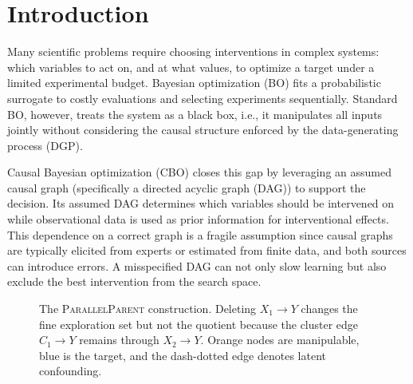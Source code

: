 \documentclass[twoside]{article}
\begin{document}


\begin{abstract}
Ignore the abstract for now

We need to write this, just writing here something so that the figure appears on the right side of the page 

for visual purposes only

right 

right

right

right

right

right

right
\end{abstract}

\section{Introduction}
\label{sec:intro}

Many scientific problems require choosing interventions in complex systems: which variables to act on, and at what values, to optimize a target under a limited experimental budget. Bayesian optimization (BO) fits a probabilistic surrogate to costly evaluations and selecting experiments sequentially. Standard BO, however, treats the system as a black box, i.e., it manipulates all inputs jointly without considering the causal structure enforced by the data-generating process (DGP). 

Causal Bayesian optimization (CBO)
\citep{agliettiCausalBayesianOptimization2020b} closes this gap by leveraging an assumed causal graph (specifically a directed acyclic graph (DAG)) to support the decision. Its assumed DAG determines which variables should be intervened on while observational data is used as prior information for interventional effects. This dependence on a correct graph is a fragile assumption since causal graphs are typically elicited from experts or estimated from finite data, and both sources can introduce errors. A misspecified DAG can not only slow learning but also exclude the best intervention from the search space. 

\begin{figure}[t]
  \centering
  
  \caption{The \textsc{ParallelParent} construction. Deleting
  $X_1\to Y$ changes the fine exploration set but not the quotient because the cluster edge $C_1\to Y$ remains through $X_2\to Y$. Orange nodes are manipulable, blue is the target, and the dash-dotted edge denotes latent
  confounding.}
  \label{fig:motivating}
\end{figure}
\end{document}
